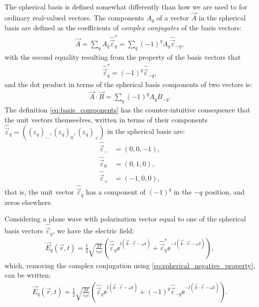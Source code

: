 The spherical basis is defined somewhat differently than how we are used to for ordinary real-valued vectors. The components $A_q$ of a vector $\vec A$ in the spherical basis are defined as the coefficients of \emph{complex conjugates} of the basis vectors:
\begin{align}\label{eq:basis_components}
\vec A = \sum_q A_q \hat{\vec\varepsilon}_q^* = \sum_q (-1)^q A_q \hat{\vec\varepsilon}_{-q},
\end{align}
with the second equality resulting from the property of the basis vectors that
\begin{align}\label{eq:spherical_negative_property}
\hat{\vec\varepsilon}_q^* = (-1)^q\hat{\vec\varepsilon}_{-q},
\end{align}
and the dot product in terms of the spherical basis components of two vectors is:
\begin{align}\label{eq:spherical_dot_product}
\vec A \cdot \vec B = \sum_q (-1)^q A_q B_{-q}.
\end{align}
The definition \eqref{eq:basis_components} has the counter-intuitive consequence that the unit vectors themseelves, written in terms of their components $\hat{\vec\varepsilon}_q = \left((\varepsilon_q)_{-}, (\varepsilon_q)_{0}, (\varepsilon_q)_{+}\right)$ in the spherical basis are:
\begin{align}
\hat{\vec\varepsilon}_{-} &= (0, 0, -1),\\
\hat{\vec\varepsilon}_0 &= (0, 1, 0),\\
\hat{\vec\varepsilon}_{+} &= (-1, 0, 0),
\end{align}
that is, the unit vector $\hat{\vec\varepsilon}_{q}$ has a component of $(-1)^q$ in the $-q$ position, and zeros elsewhere.

Considering a plane wave with polarisation vector equal to one of the spherical basis vectors $\hat{\vec\varepsilon}_q$, we have the electric field:
\begin{align}\label{eq:complex_plane_wave_q}
\vec E_q(\vec r, t) = \frac12\sqrt{\frac{2I}{\varepsilon_0 c}}
\left(\hat{\vec\varepsilon}_q \ee^{\ii(\vec k \cdot \vec r - \omega t)}
+ \hat{\vec\varepsilon}_q^* \ee^{-\ii(\vec k \cdot \vec r - \omega t)} \right),
\end{align}
which, removing the complex conjugation using \eqref{eq:spherical_negative_property}, can be written:
\begin{align}\label{eq:complex_plane_wave_q_noconj}
\vec E_q(\vec r, t) = \frac12\sqrt{\frac{2I}{\varepsilon_0 c}}
\left(\hat{\vec\varepsilon}_q \ee^{\ii(\vec k \cdot \vec r - \omega t)}
+ (-1)^q\hat{\vec\varepsilon}_{-q} \ee^{-\ii(\vec k \cdot \vec r - \omega t)} \right).
\end{align}

